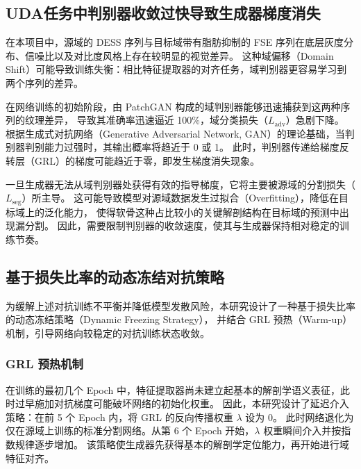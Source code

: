   \subsection{UDA任务中判别器收敛过快导致生成器梯度消失}
    在本项目中，源域的 DESS 序列与目标域带有脂肪抑制的 FSE 序列在底层灰度分布、信噪比以及对比度风格上存在较明显的视觉差异。
    这种域偏移（Domain Shift）可能导致训练失衡：相比特征提取器的对齐任务，域判别器更容易学习到两个序列的差异。
    \par 在网络训练的初始阶段，由 PatchGAN\cite{isolaImagetoImageTranslationConditional2017} 构成的域判别器能够迅速捕获到这两种序列的纹理差异，
    导致其准确率迅速逼近 100\%，域分类损失（$L_{\mathrm{adv}}$）急剧下降。
    根据生成式对抗网络（Generative Adversarial Network, GAN）的理论基础，当判别器判别能力过强时，其输出概率将趋近于 0 或 1。
    此时，判别器传递给梯度反转层（GRL）的梯度可能趋近于零，即发生梯度消失现象。
    \par 一旦生成器无法从域判别器处获得有效的指导梯度，它将主要被源域的分割损失（$L_{\mathrm{seg}}$）所主导。
    这可能导致模型对源域数据发生过拟合（Overfitting），降低在目标域上的泛化能力，
    使得软骨这种占比较小的关键解剖结构在目标域的预测中出现漏分割。
    因此，需要限制判别器的收敛速度，使其与生成器保持相对稳定的训练节奏。
  \subsection{基于损失比率的动态冻结对抗策略}
    为缓解上述对抗训练不平衡并降低模型发散风险，本研究设计了一种基于损失比率的动态冻结策略（Dynamic Freezing Strategy），
    并结合 GRL 预热（Warm-up）机制，引导网络向较稳定的对抗训练状态收敛。
    \subsubsection{GRL 预热机制}
      在训练的最初几个 Epoch 中，特征提取器尚未建立起基本的解剖学语义表征，此时过早施加对抗梯度可能破坏网络的初始化权重。
      因此，本研究设计了延迟介入策略：在前 5 个 Epoch 内，将 GRL 的反向传播权重 $\lambda$ 设为 $0$。
      此时网络退化为仅在源域上训练的标准分割网络。从第 6 个 Epoch 开始，$\lambda$ 权重瞬间介入并按指数规律逐步增加。
      该策略使生成器先获得基本的解剖学定位能力，再开始进行域特征对齐。
